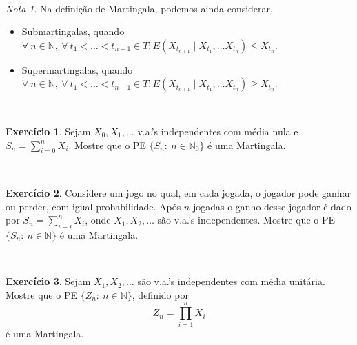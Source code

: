 \documentclass[
  11pt,
  a4paper,
]{book}
\theoremstyle{definition}
\theoremstyle{definition}
\theoremstyle{definition}
\newtheorem{exercise}{Exercício}[chapter]
\theoremstyle{definition}
\theoremstyle{remark}
\newtheorem*{remark}{Nota }
\begin{document}
\(\,\)

\begin{remark}

Na definição de Martingala, podemos ainda considerar,

\begin{itemize}
\item
  Submartingalas, quando \(\forall ~n \in \mathbb{N}, ~\forall ~t_1< \ldots < t_{n+1} \in T: E(X_{t_{n+1}} \mid X_{t_1}, \ldots X_{t_n}) \leq X_{t_n}\).
\item
  Supermartingalas, quando \(\forall ~n \in \mathbb{N}, ~\forall ~t_1< \ldots < t_{n+1} \in T: E(X_{t_{n+1}} \mid X_{t_1}, \ldots X_{t_n}) \geq X_{t_n}\).
\end{itemize}

\end{remark}

\(\,\)

\begin{exercise}
\leavevmode

Sejam \(X_0, X_1, \dots\) v.a.'s independentes com média nula e \(S_n=\sum\limits_{i=0}^{n}X_i\). Mostre que o PE \(\{S_n: ~n \in \mathbb{N}_0\}\) é uma Martingala.

\end{exercise}

\(\,\)

\begin{exercise}
\leavevmode

Considere um jogo no qual, em cada jogada, o jogador pode ganhar ou perder, com igual probabilidade. Após \(n\) jogadas o ganho desse jogador é dado por \(S_n=\sum\limits_{i=i}^{n}X_i\), onde \(X_1, X_2, \dots\) são v.a.'s independentes. Mostre que o PE \(\{S_n: ~n \in \mathbb{N}\}\) é uma Martingala.

\end{exercise}

\(\,\)

\begin{exercise}
\leavevmode

Sejam \(X_1, X_2, \dots\) são v.a.'s independentes com média unitária. Mostre que o PE \(\{Z_n: ~n \in \mathbb{N}\}\), definido por
\[Z_n=\prod\limits_{i=1}^{n}X_i\]
é uma Martingala.

\end{exercise}

\(\,\)
\end{document}
